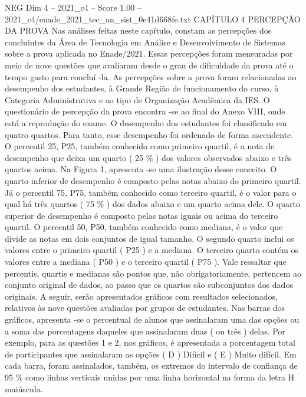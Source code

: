 \begin{textsample}{NEG Dim 4 – 2021\_c4 – Score 1.00 – 2021\_c4/enade\_2021\_tec\_an\_sist\_0e41d668fe.txt}  \label{ex:f4_neg_221}
CAPÍTULO 4 PERCEPÇÃO DA PROVA Nas análises feitas neste capítulo, constam as percepções dos concluintes da Área de Tecnologia em Análise e Desenvolvimento de Sistemas sobre a prova aplicada no Enade/2021.
Essas percepções foram mensuradas por meio de nove questões que avaliaram desde o grau de dificuldade da prova até o tempo gasto para concluí -la.
As percepções sobre a prova foram relacionadas ao desempenho dos estudantes, à Grande Região de funcionamento do curso, à Categoria Administrativa e ao tipo de Organização Acadêmica da IES.
O questionário de percepção da prova encontra -se ao final do Anexo VIII, onde está a reprodução do exame.
O desempenho dos estudantes foi classificado em quatro quartos.
Para tanto, esse desempenho foi ordenado de forma ascendente.
O percentil 25, P25, também conhecido como primeiro quartil, é a nota de desempenho que deixa um quarto ( 25 \% ) dos valores observados abaixo e três quartos acima.
Na Figura 1, apresenta -se uma ilustração desse conceito.
O quarto inferior de desempenho é composto pelas notas abaixo do primeiro quartil.
Já o percentil 75, P75, também conhecido como terceiro quartil, é o valor para o qual há três quartos ( 75 \% ) dos dados abaixo e um quarto acima dele.
O quarto superior de desempenho é composto pelas notas iguais ou acima do terceiro quartil.
O percentil 50, P50, também conhecido como mediana, é o valor que divide as notas em dois conjuntos de igual tamanho.
O segundo quarto inclui os valores entre o primeiro quartil ( P25 ) e a mediana.
O terceiro quarto contém os valores entre a mediana ( P50 ) e o terceiro quartil ( P75 ).
Vale ressaltar que percentis, quartis e medianas são pontos que, não obrigatoriamente, pertencem ao conjunto original de dados, ao passo que os quartos são subconjuntos dos dados originais.
A seguir, serão apresentados gráficos com resultados selecionados, relativos às nove questões avaliadas por grupos de estudantes.
Nas barras dos gráficos, apresenta -se o percentual de alunos que assinalaram uma das opções ou a soma das porcentagens daqueles que assinalaram duas ( ou três ) delas.
Por exemplo, para as questões 1 e 2, nos gráficos, é apresentada a porcentagem total de participantes que assinalaram as opções ( D ) Difícil e ( E ) Muito difícil.
Em cada barra, foram assinalados, também, os extremos do intervalo de confiança de 95 \% como linhas verticais unidas por uma linha horizontal na forma da letra H maiúscula.

\end{textsample}
